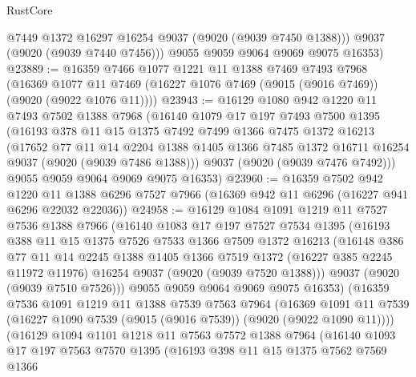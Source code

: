 \begin{lexlean}{RustCore}
\begin{coremodule}
          @7449
          @1372
          @16297
          @16254
          @9037
          (@9020 (@9039 @7450 @1388)))
        @9037
        (@9020 (@9039 @7440 @7456)))
      @9055
      @9059
      @9064
      @9069
      @9075
      @16353)
@23889 := @16359
    @7466
    @1077
    @1221
    @11
    @1388
    @7469
    @7493
    @7968
    (@16369 @1077 @11 @7469 (@16227 @1076 @7469 (@9015 (@9016 @7469)) (@9020 (@9022 @1076 @11))))
@23943 := @16129
    @1080
    @942
    @1220
    @11
    @7493
    @7502
    @1388
    @7968
    (@16140
      @1079
      @17
      @197
      @7493
      @7500
      @1395
      (@16193
        @378
        @11
        @15
        @1375
        @7492
        @7499
        @1366
        @7475
        @1372
        @16213
        (@17652
          @77
          @11
          @14
          @2204
          @1388
          @1405
          @1366
          @7485
          @1372
          @16711
          @16254
          @9037
          (@9020 (@9039 @7486 @1388)))
        @9037
        (@9020 (@9039 @7476 @7492)))
      @9055
      @9059
      @9064
      @9069
      @9075
      @16353)
@23960 := @16359
    @7502
    @942
    @1220
    @11
    @1388
    @6296
    @7527
    @7966
    (@16369 @942 @11 @6296 (@16227 @941 @6296 @22032 @22036))
@24958 := @16129
    @1084
    @1091
    @1219
    @11
    @7527
    @7536
    @1388
    @7966
    (@16140
      @1083
      @17
      @197
      @7527
      @7534
      @1395
      (@16193
        @388
        @11
        @15
        @1375
        @7526
        @7533
        @1366
        @7509
        @1372
        @16213
        (@16148
          @386
          @77
          @11
          @14
          @2245
          @1388
          @1405
          @1366
          @7519
          @1372
          (@16227 @385 @2245 @11972 @11976)
          @16254
          @9037
          (@9020 (@9039 @7520 @1388)))
        @9037
        (@9020 (@9039 @7510 @7526)))
      @9055
      @9059
      @9064
      @9069
      @9075
      @16353)
    (@16359
      @7536
      @1091
      @1219
      @11
      @1388
      @7539
      @7563
      @7964
      (@16369 @1091 @11 @7539 (@16227 @1090 @7539 (@9015 (@9016 @7539)) (@9020 (@9022 @1090 @11))))
      (@16129
        @1094
        @1101
        @1218
        @11
        @7563
        @7572
        @1388
        @7964
        (@16140
          @1093
          @17
          @197
          @7563
          @7570
          @1395
          (@16193
            @398
            @11
            @15
            @1375
            @7562
            @7569
            @1366

\end{coremodule}
\end{lexlean}
